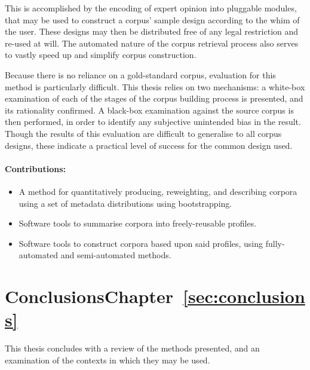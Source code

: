 This is accomplished by the encoding of expert opinion into pluggable modules, that may be used to construct a corpus' sample design according to the whim of the user.  These designs may then be distributed free of any legal restriction and re-used at will.  The automated nature of the corpus retrieval process also serves to vastly speed up and simplify corpus construction.

Because there is no reliance on a gold-standard corpus, evaluation for this method is particularly difficult.  This thesis relies on two mechanisms: a white-box examination of each of the stages of the corpus building process is presented, and its rationality confirmed.  A black-box examination against the source corpus is then performed, in order to identify any subjective unintended bias in the result.  Though the results of this evaluation are difficult to generalise to all corpus designs, these indicate a practical level of success for the common design used.

\paragraph{Contributions:}
\begin{itemize}
    \item A method for quantitatively producing, reweighting, and describing corpora using a set of metadata distributions using bootstrapping.
    \item Software tools to summarise corpora into freely-reusable profiles.
    \item Software tools to construct corpora based upon said profiles, using fully-automated and semi-automated methods.
\end{itemize}


\section{Conclusions\hfill{}Chapter~\ref{sec:conclusions}}
This thesis concludes with a review of the methods presented, and an examination of the contexts in which they may be used.

\sepline

